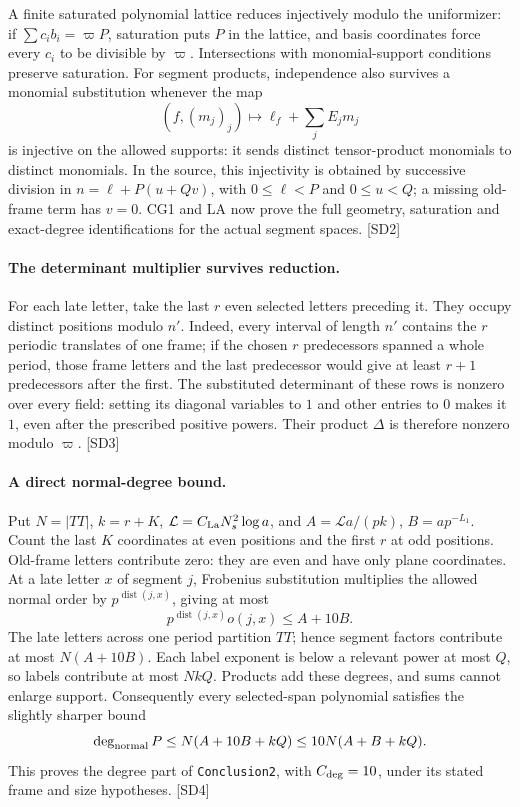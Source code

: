 \documentclass[11pt,a4paper]{article}
\numberwithin{equation}{section}
\theoremstyle{remark}\newtheorem{remark}[theorem]{Remark}
\begin{document}
A finite saturated polynomial lattice reduces injectively modulo the uniformizer: if $\sum c_i b_i=\varpi P$, saturation puts $P$ in the lattice, and basis coordinates force every $c_i$ to be divisible by $\varpi$. Intersections with monomial-support conditions preserve saturation. For segment products, independence also survives a monomial substitution whenever the map
\[
 (f,(m_j)_j)\longmapsto \ell_f+\sum_j E_jm_j
\]
is injective on the allowed supports: it sends distinct tensor-product monomials to distinct monomials. In the source, this injectivity is obtained by successive division in
$n=\ell+P(u+Qv)$, with $0\le\ell<P$ and $0\le u<Q$; a missing old-frame term has $v=0$. CG1 and LA now prove the full geometry, saturation and exact-degree identifications for the actual segment spaces. \textsf{[SD2]}

\paragraph{The determinant multiplier survives reduction.}
For each late letter, take the last $r$ even selected letters preceding it. They occupy distinct positions modulo $n'$. Indeed, every interval of length $n'$ contains the $r$ periodic translates of one frame; if the chosen $r$ predecessors spanned a whole period, those frame letters and the last predecessor would give at least $r+1$ predecessors after the first. The substituted determinant of these rows is nonzero over every field: setting its diagonal variables to $1$ and other entries to $0$ makes it $1$, even after the prescribed positive powers. Their product $\Delta$ is therefore nonzero modulo $\varpi$. \textsf{[SD3]}

\paragraph{A direct normal-degree bound.}
Put $N=|TT|$, $k=r+K$, $\mathcal L=C_{\rm La}N_s^2\log a$, and
$A=\mathcal L a/(pk)$, $B=ap^{-L_1}$. Count the last $K$ coordinates at even positions and the first $r$ at odd positions. Old-frame letters contribute zero: they are even and have only plane coordinates. At a late letter $x$ of segment $j$, Frobenius substitution multiplies the allowed normal order by $p^{\operatorname{dist}(j,x)}$, giving at most
\[
 p^{\operatorname{dist}(j,x)}o(j,x)\le A+10B.
\]
The late letters across one period partition $TT$; hence segment factors contribute at most $N(A+10B)$. Each label exponent is below a relevant power at most $Q$, so labels contribute at most $NkQ$. Products add these degrees, and sums cannot enlarge support. Consequently every selected-span polynomial satisfies the slightly sharper bound
\[
 \deg_{\rm normal}P\le N(A+10B+kQ)
                 \le10N(A+B+kQ).
\]
This proves the degree part of \texttt{Conclusion2}, with $C_{\rm deg}=10$, under its stated frame and size hypotheses. \textsf{[SD4]}
\end{document}
